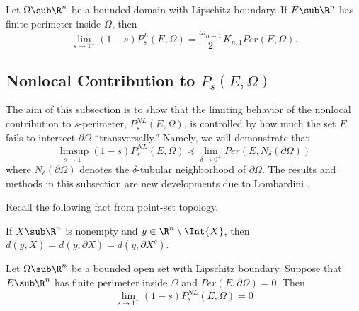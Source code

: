 \documentclass[../main.tex]{subfiles}
\begin{document}
\begin{proposition}\label{localsto1}
    Let $ \Omega\sub \R^{n} $ be a bounded domain with Lipschitz boundary. If $ E\sub \R^{n} $ has finite perimeter inside $ \Omega $, then
    \[
        \lim_{s\to1^{-}}(1-s)P_{s}^{L}(E,\Omega) = \frac{\omega_{n-1}}{2}K_{n,1}Per(E,\Omega).
    \]
\end{proposition}

\subsection{Nonlocal Contribution to $ P_{s}(E,\Omega) $}

The aim of this subsection is to show that the limiting behavior of the nonlocal contribution to $ s $-perimeter, $ P_{s}^{NL}(E,\Omega) $, is controlled by how much the set $ E $ fails to intersect $ \partial \Omega $ ``transversally.'' Namely, we will demonstrate that
\[
    \limsup_{s\to1^{-}}(1-s)P_{s}^{NL}(E,\Omega) \preceq \lim_{\delta\to0^{+}}Per(E,N_{\delta}(\partial \Omega))
\]
where $ N_{\delta}(\partial \Omega) $ denotes the $ \delta $-tubular neighborhood of $ \partial \Omega $. The results and methods in this subsection are new developments due to Lombardini \cite{lombardini:2019}.


Recall the following fact from point-set topology.
\begin{fact}\label{distancefact}
    If $ X\sub \R^{n} $ is nonempty and $ y\in \R^{n}\setminus\Int{X} $, then $ d(y,X) = d(y,\partial X) = d(y, \partial X^{c})$.
\end{fact}
\newpage



\begin{theorem}
    Let $ \Omega\sub \R^{n} $ be a bounded open set with Lipschitz boundary. Suppose that $ E\sub \R^{n} $ has finite perimeter inside $ \Omega $ and $ Per(E,\partial \Omega) = 0 $. Then 
    \[
        \lim_{s\to1^{-}}(1-s) P_{s}^{NL}(E,\Omega) = 0 
    \]
\end{theorem}

\begin{wrapfigure}{r}{0.5\textwidth}
    \begin{center}
    
    \end{center}
    \vspace{-10mm}
\end{wrapfigure}
\end{document}
